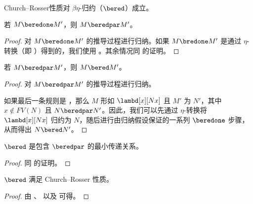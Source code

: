 \documentclass[../../../include/open-logic-section]{subfiles}
\begin{document}


Church--Rosser性质对 $\beta\eta$-归约（$\bered$）成立。

\begin{lem}
  若 $M \beredone M'$，则 $M \beredpar M'$。
\end{lem}

\begin{proof}
  对 $M \beredone M'$ 的推导过程进行归纳。如果 $M \bredone M'$ 是通过 $\eta$-转换（即 ）得到的，我们使用 。其余情况同  的证明。
\end{proof}

\begin{lem}
  若 $M \beredpar M'$，则 $M \bered M'$。
\end{lem}

\begin{proof}
  对 $M \beredpar M'$ 的推导过程进行归纳。

  如果最后一条规则是 ，那么 $M$ 形如 $\lambd[x][Nx]$ 且 $M'$ 为 $N'$，其中 $x \notin FV(N)$ 且 $N \beredpar N'$。因此，我们可以先通过 $\eta$-转换将 $\lambd[x][Nx]$ 归约为 $N$，随后进行由归纳假设保证的一系列 $\beredone$ 步骤，从而得出 $N \bered N'$。
\end{proof}

\begin{lem}
  $\bered$ 是包含 $\beredpar$ 的最小传递关系。
\end{lem}

\begin{proof}
  同  的证明。
\end{proof}

\begin{thm}
  $\bered$ 满足 Church--Rosser 性质。
\end{thm}

\begin{proof}
  由 、 以及  可得。
\end{proof}
\end{document}
